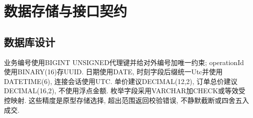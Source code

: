\documentclass[cn,nofont,11pt,a4paper]{elegantpaper}
\begin{document}
\hypertarget{ux6570ux636eux5b58ux50a8ux4e0eux63a5ux53e3ux5951ux7ea6}{%
\section{数据存储与接口契约}\label{ux6570ux636eux5b58ux50a8ux4e0eux63a5ux53e3ux5951ux7ea6}}

\hypertarget{ux6570ux636eux5e93ux8bbeux8ba1}{%
\subsection{数据库设计}\label{ux6570ux636eux5e93ux8bbeux8ba1}}

业务编号使用BIGINT UNSIGNED代理键并给对外编号加唯一约束; operationId使用BINARY(16)存UUID. 日期使用DATE, 时刻字段后缀统一Utc并使用DATETIME(6), 连接会话使用UTC. 单价建议DECIMAL(12,2), 订单总价建议DECIMAL(16,2), 不使用浮点金额. 枚举字段采用VARCHAR加CHECK或等效受控映射. 这些精度是原型存储选择, 超出范围返回校验错误, 不静默截断或四舍五入成交.
\end{document}
